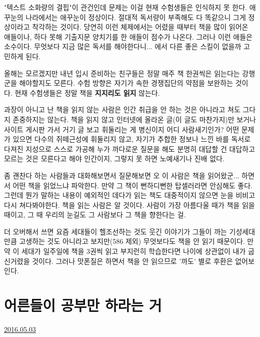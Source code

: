 "텍스트 소화량의 결핍"이 관건인데 문제는 이걸 현재 수험생들은 인식하지 못 한다.
애꾸눈의 나라에서는 애꾸눈이 정상이다. 절대적 독서량이 부족해도 다 똑같으니 그게 정상이라고 착각하는 것이다.
당연히 이런 체제에서는 어렸을 때부터 책을 많이 읽어온 애들이나, 하다 못해 기출지문 양치기를 한 애들이 점수가 나온다.
그러나 이런 애들은 소수이다. 무엇보다 지금 많은 독서를 해야한다니... 에서 다른 좋은 스킬이 없을까 고민하게 된다.
\vspace{5mm}

올해는 모르겠지만 내년 입시 준비하는 친구들은 정말 매주 책 한권씩은 읽는다는 강행군을 해야할지도 모른다.
수험 방향은 자기가 속한 경쟁집단의 약점을 보완하는 것이다. 현재 수험생들은 정말 책을 \textbf{지지리도 읽지} 않는다.
\vspace{5mm}

과장이 아니고 난 책을 읽지 않는 사람은 인간 취급을 안 하는 것은 아니라고 쳐도 그다지 존중하지는 않는다.
책을 읽지 않고 인터넷에 올라온 글(이 글도 마찬가지)만 보거나 사이트 게시판 가서 거기 글 보고 휘둘리는 게 병신이지 어디 사람새기인가?
어떤 문제가 있으면 다수의 쥐떼근성에 휘둘리지 않고, 자기가 추합한 정보나 느낀 바를 독서로 다져진 지성으로 스스로 가공해
누가 까다로운 질문을 해도 분명히 대답할 건 대답하고 모르는 것은 모른다고 해야 인간이지, 그렇지 못 하면 노예새기나 진배 없다.
\vspace{5mm}

좀 괜찬다 하는 사람들과 대화해보면서 질문해보면 오 이 사람은 책을 읽어왔군... 하면서 어떤 책을 읽었느냐 파악한다.
만약 그 책이 뻔하디뻔한 탑셀러라면 안심해도 좋다.
그런데 뭔가 말하는 내용이 예외적인 데다가 읽는 책도 대중적이지 않으면 눈을 비비고 다시 쳐다봐야한다.
책을 읽는 사람은 알 것이다. 사람이 가장 아름다울 때가 책을 읽을 때이고, 그 때 우리의 눈길도 그 사람보다 그 책을 향한다는 걸.
\vspace{5mm}

더 오버해서 쓰면 요즘 세대들이 헬조선하는 것도 웃긴 이야기가 그들이 까는 기성세대만큼 고생하는 것도 아니라고 보지만(586 제외)
무엇보다도 책을 안 읽기 때문이다. 만약 이 세대가 일주일에 책을 3권씩 읽고 부지런히 학습한다면 나이에 상관없이 내가 굽신거렸을 것이다.
그러나 맛폰질은 하면서 책을 안 읽으므로 '까도' 별로 후환은 없어보인다.
\vspace{5mm}








\section{어른들이 공부만 하라는 거}
\href{https://www.kockoc.com/Apoc/758269}{2016.05.03}

